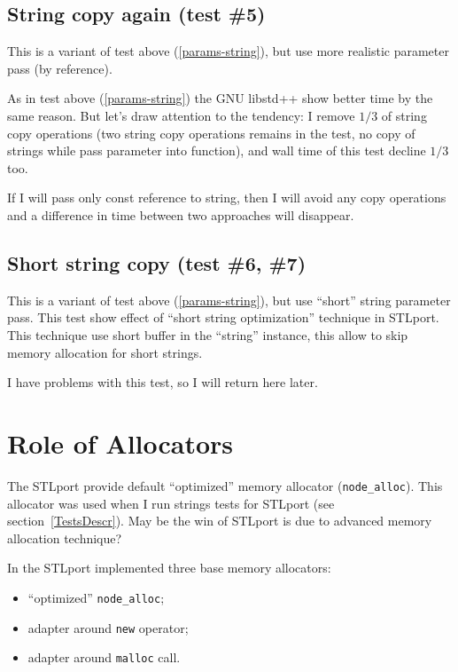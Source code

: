 \documentclass[a4paper]{article}
\providecommand{\STLport}{{\fontfamily{cmss}\selectfont STLport}}
\providecommand{\libstd}{{\fontfamily{cmtt}\selectfont GNU \mbox{libstd++}}}
\begin{document}
\subsection{String copy again\label{params-ref-string} (test \#5)}

This is a variant of test above (\ref{params-string}), but use more realistic
parameter pass (by reference).



As in test above (\ref{params-string}) the \libstd{} show better time
by the same reason. But let's draw attention to the tendency: I remove
$1/3$ of string copy operations (two string copy operations remains in the test, no copy of strings while pass
parameter into function), and wall time of this test decline $1/3$ too.

If I will pass only const reference to string, then I will avoid any copy
operations and a difference in time between two approaches will disappear.

\subsection{Short string copy\label{params-short-string} (test \#6, \#7)}

This is a variant of test above (\ref{params-string}), but use ``short'' string
parameter pass. This test show effect of ``short string optimization'' technique
in \STLport{}. This technique use short buffer in the ``string'' instance,
this allow to skip memory allocation for short strings.



I have problems with this test, so I will return here later.

\section{Role of Allocators}

The \STLport{} provide default ``optimized'' memory allocator
(\verb|node_alloc|). This allocator was used when I run strings tests
for \STLport{} (see section~\ref{TestsDescr}). May be the win of \STLport{} is
due to advanced memory allocation technique?

In the \STLport{} implemented three base memory allocators:
\begin{itemize}
  \item ``optimized'' \verb|node_alloc|;
  \item adapter around \verb|new| operator;
  \item adapter around \verb|malloc| call.
\end{itemize}
\end{document}
